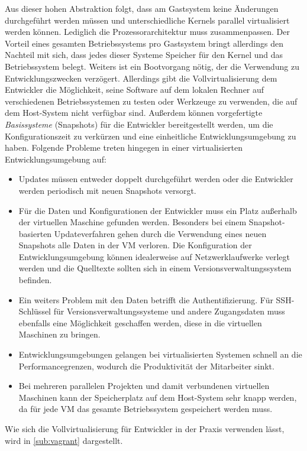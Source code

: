 Aus dieser hohen Abstraktion folgt, dass am Gastsystem keine Änderungen durchgeführt werden müssen und unterschiedliche Kernels parallel virtualisiert werden können.
Lediglich die Prozessorarchitektur muss zusammenpassen.
Der Vorteil eines gesamten Betriebssystems pro Gastsystem bringt allerdings den Nachteil mit sich, dass jedes dieser Systeme Speicher für den Kernel und das Betriebssystem belegt. Weiters ist ein Bootvorgang nötig, der die Verwendung zu Entwicklungszwecken verzögert.
Allerdings gibt die Vollvirtualisierung dem Entwickler die Möglichkeit, seine Software auf dem lokalen Rechner auf verschiedenen Betriebssystemen zu testen oder Werkzeuge zu verwenden, die auf dem Host-System nicht verfügbar sind.
Außerdem können vorgefertigte \emph{Basissysteme} (Snapshots) für die Entwickler bereitgestellt werden, um die Konfigurationszeit zu verkürzen und eine einheitliche Entwicklungsumgebung zu haben.
Folgende Probleme treten hingegen in einer virtualisierten Entwicklungsumgebung auf:
\begin{itemize}
\item Updates müssen entweder doppelt durchgeführt werden oder die Entwickler werden periodisch mit neuen Snapshots versorgt.
\item Für die Daten und Konfigurationen der Entwickler muss ein Platz außerhalb der virtuellen Maschine gefunden werden. Besonders bei einem Snapshot-basierten Updateverfahren gehen durch die Verwendung eines neuen Snapshots alle Daten in der VM verloren. Die Konfiguration der Entwicklungsumgebung können idealerweise auf Netzwerklaufwerke verlegt werden und die Quelltexte sollten sich in einem Versionsverwaltungssystem befinden.
\item Ein weiters Problem mit den Daten betrifft die Authentifizierung. Für SSH-Schlüssel für Versionsverwaltungssysteme und andere Zugangsdaten muss ebenfalls eine Möglichkeit geschaffen werden, diese in die virtuellen Maschinen zu bringen.
\item Entwicklungsumgebungen gelangen bei virtualisierten Systemen schnell an die Performancegrenzen, wodurch die Produktivität der Mitarbeiter sinkt.
\item Bei mehreren parallelen Projekten und damit verbundenen virtuellen Maschinen kann der Speicherplatz auf dem Host-System sehr knapp werden, da für jede VM das gesamte Betriebssystem gespeichert werden muss.
\end{itemize}
Wie sich die Vollvirtualisierung für Entwickler in der Praxis verwenden lässt, wird in \cref{sub:vagrant} dargestellt.


